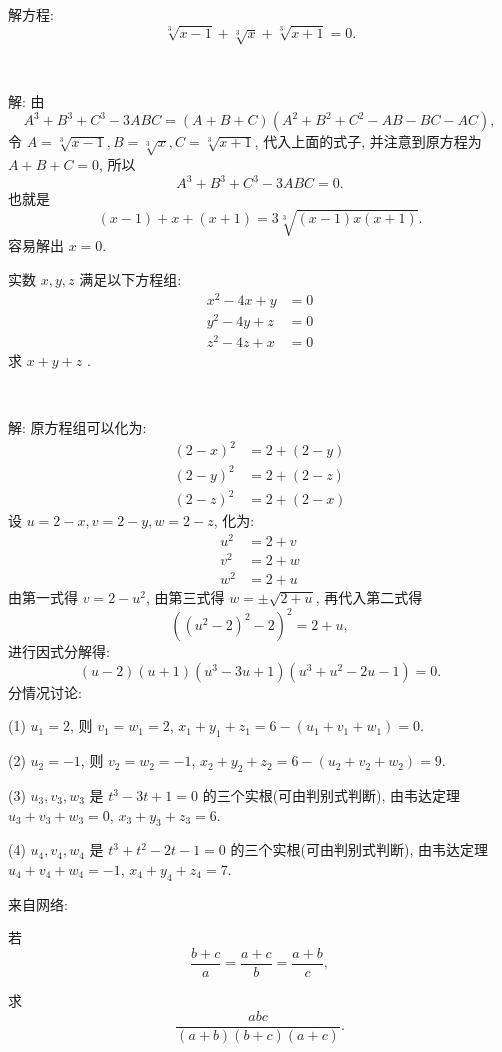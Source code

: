 解方程: 
\[\sqrt[3]{x-1} + \sqrt[3]{x} + \sqrt[3]{x+1} = 0 .\]

~

解: 由 
\[A^3+B^3+C^3 - 3ABC = (A+B+C)(A^2+B^2+C^2-AB-BC-AC), \]
令 $A = \sqrt[3]{x-1}, B = \sqrt[3]{x}, C = \sqrt[3]{x+1}$, 代入上面的式子, 并注意到原方程为 $A+B+C = 0$, 所以
\[A^3+B^3+C^3-3ABC = 0.\]
也就是
\[(x-1) + x + (x+1) = 3\sqrt[3]{(x-1)x(x+1)} .\]
容易解出 $x = 0$.

\newpage
实数 $x,y,z$ 满足以下方程组:
\begin{align*}
x^2 - 4x + y &= 0 \\
y^2 - 4y + z &= 0\\
z^2 - 4z + x &= 0
\end{align*}
求 $x+y+z$ .

~

解: 原方程组可以化为:
\begin{align*}
(2-x)^2 &= 2 + (2-y) \\
(2-y)^2 &= 2 + (2-z)\\
(2-z)^2 &= 2 + (2-x)
\end{align*}
设 $u = 2-x, v = 2-y, w = 2-z$, 化为:
\begin{align*}
u^2 &= 2 + v \\
v^2 &= 2 + w\\
w^2 &= 2 + u
\end{align*}
由第一式得 $v = 2 - u^2$, 由第三式得 $w = \pm\sqrt{2+u}$, 再代入第二式得
\[((u^2-2)^2 - 2)^2 = 2+u  ,\]
进行因式分解得:
\[(u-2)(u+1)(u^3-3u+1)(u^3+u^2-2u-1) = 0 .\]
分情况讨论:

(1) $u_1 = 2$, 则 $v_1 = w_1 = 2$, $x_1+y_1+z_1 = 6 - (u_1+v_1+w_1) = 0.$

(2) $u_2 = -1$, 则 $v_2 = w_2 = -1$, $x_2+y_2+z_2 = 6 - (u_2+v_2+w_2) = 9.$

(3) $u_3, v_3, w_3$ 是 $t^3-3t+1=0$ 的三个实根(可由判别式判断), 由韦达定理 $u_3+v_3+w_3 = 0$, $x_3+y_3+z_3 = 6$.

(4) $u_4, v_4, w_4$ 是 $t^3+t^2-2t-1=0$ 的三个实根(可由判别式判断), 由韦达定理 $u_4+v_4+w_4 = -1$, $x_4+y_4+z_4 = 7$.


\newpage
\noindent 来自网络: 

若 $$\dfrac{b+c}{a}=\dfrac{a+c}{b}=\dfrac{a+b}{c},$$ 

求 $$\dfrac{abc}{(a+b)(b+c)(a+c)}.$$

~

